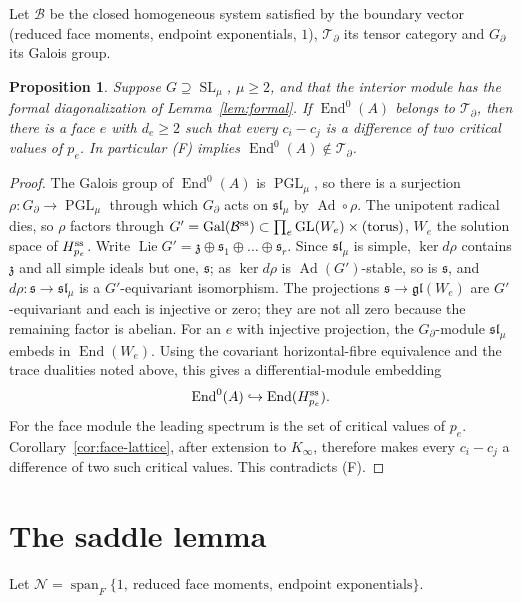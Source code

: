 \documentclass[11pt]{article}
\numberwithin{equation}{section}
\newtheorem{proposition}[proposition]{Proposition}
\theoremstyle{definition}
\theoremstyle{remark}
\newcommand{\Span}{\operatorname{span}}
\newcommand{\End}{\operatorname{End}}
\newcommand{\Gal}{\operatorname{Gal}}
\newcommand{\Lie}{\operatorname{Lie}}
\newcommand{\SL}{\operatorname{SL}}
\newcommand{\GL}{\operatorname{GL}}
\newcommand{\Ncal}{\mathcal N}
\newcommand{\Tcal}{\mathcal T}
\newcommand{\PGL}{\operatorname{PGL}}
\newcommand{\Bcal}{\mathcal B}
\begin{document}
Let $\Bcal$ be the closed homogeneous system satisfied by the boundary vector
(reduced face moments, endpoint exponentials, $1$), $\Tcal_\partial$ its tensor
category and $G_\partial$ its Galois group.

\begin{proposition}\label{prop:faces}
Suppose $G\supseteq\SL_\mu$, $\mu\ge2$, and that the interior module
has the formal diagonalization of Lemma~\ref{lem:formal}. If $\End^0(A)$
belongs to $\Tcal_\partial$, then there is a face $e$ with $d_e\ge2$ such that
every $c_i-c_j$ is a difference of two critical values of $p_e$. In particular
\textup{(F)} implies $\End^0(A)\notin\Tcal_\partial$.
\end{proposition}
\begin{proof}
The Galois group of $\End^0(A)$ is $\PGL_\mu$, so there is a surjection
$\rho:G_\partial\to\PGL_\mu$ through which $G_\partial$ acts on
$\mathfrak{sl}_\mu$ by $\operatorname{Ad}\circ\rho$. The unipotent radical dies,
so $\rho$ factors through $G'=\Gal(\Bcal^{\rm ss})\subset\prod_e\GL(W_e)\times(\text{torus})$,
$W_e$ the solution space of $H_{p_e}^{\rm ss}$. Write
$\Lie G'=\mathfrak z\oplus\mathfrak s_1\oplus\dots\oplus\mathfrak s_r$. Since
$\mathfrak{sl}_\mu$ is simple, $\ker d\rho$ contains $\mathfrak z$ and all simple
ideals but one, $\mathfrak s$; as $\ker d\rho$ is $\operatorname{Ad}(G')$-stable,
so is $\mathfrak s$, and $d\rho:\mathfrak s\to\mathfrak{sl}_\mu$ is a
$G'$-equivariant isomorphism. The projections
$\mathfrak s\to\mathfrak{gl}(W_e)$ are $G'$-equivariant and each is injective or
zero; they are not all zero because the remaining factor is abelian. For an
$e$ with injective projection, the $G_\partial$-module $\mathfrak{sl}_\mu$ embeds
in $\End(W_e)$. Using the covariant horizontal-fibre equivalence and the trace dualities
noted above, this gives a differential-module embedding
\[
 \End^0(A)\hookrightarrow\End(H_{p_e}^{\rm ss}).
\]
For the face module the leading spectrum is the set of critical values of
$p_e$. Corollary~\ref{cor:face-lattice}, after extension to $K_\infty$,
therefore makes every $c_i-c_j$ a difference of two such critical values.
This contradicts (F).
\end{proof}

\section{The saddle lemma}

Let $\Ncal=\Span_F\{1,\ \text{reduced face moments},\ \text{endpoint exponentials}\}$.
\end{document}
